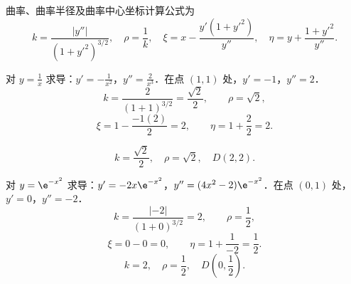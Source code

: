 \begin{solution}
    曲率、曲率半径及曲率中心坐标计算公式为
    \begin{equation}
        k = \frac{|y''|}{(1 + y'^2)^{3/2}}, \quad \rho = \frac{1}{k}, \quad \xi = x - \frac{y'(1 + y'^2)}{y''}, \quad \eta = y + \frac{1 + y'^2}{y''}.
    \end{equation}


    对 $y = \frac{1}{x}$ 求导：$y' = -\frac{1}{x^2}$，$y'' = \frac{2}{x^3}$．在点 $(1, 1)$ 处，$y' = -1$，$y'' = 2$．
    \begin{equation}
        k = \frac{2}{(1 + 1)^{3/2}} = \frac{\sqrt{2}}{2}, \qquad \rho = \sqrt{2},
    \end{equation}
    \begin{equation}
        \xi = 1 - \frac{-1(2)}{2} = 2, \qquad \eta = 1 + \frac{2}{2} = 2.
    \end{equation}

    \begin{center}
    \end{center}
    \begin{equation}
        \boxed{k = \frac{\sqrt{2}}{2}, \quad \rho = \sqrt{2}, \quad D(2, 2).}
    \end{equation}


    对 $y = \e^{-x^2}$ 求导：$y' = -2x\e^{-x^2}$，$y'' = (4x^2 - 2)\e^{-x^2}$．在点 $(0, 1)$ 处，$y' = 0$，$y'' = -2$．
    \begin{equation}
        k = \frac{|-2|}{(1 + 0)^{3/2}} = 2, \qquad \rho = \frac{1}{2},
    \end{equation}
    \begin{equation}
        \xi = 0 - 0 = 0, \qquad \eta = 1 + \frac{1}{-2} = \frac{1}{2}.
    \end{equation}
    \begin{equation}
        \boxed{k = 2, \quad \rho = \frac{1}{2}, \quad D\left(0, \frac{1}{2}\right).}
    \end{equation}
\end{solution}

